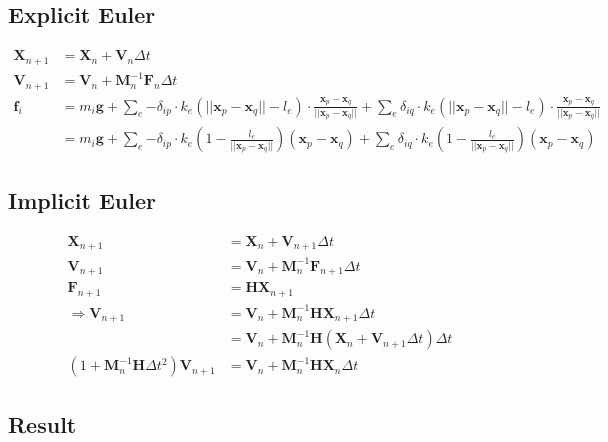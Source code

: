 \documentclass{article}
\begin{document}
\subsection*{Explicit Euler}
\begin{equation*}
  \begin{aligned}
    \bm{X}_{n+1} &= \bm{X}_n + \bm{V}_n\Delta t \\
    \bm{V}_{n+1} &= \bm{V}_n + \bm{M}_n^{-1}\bm{F}_n\Delta t \\
    \bm{f}_i &= m_i\bm{g} + \sum_e{-\delta_{ip}\cdot k_e(||\bm{x}_p-\bm{x}_q|| - l_e)\cdot \frac{\bm{x}_p-\bm{x}_q}{||\bm{x}_p-\bm{x}_q||}} + \sum_e{\delta_{iq}\cdot k_e(||\bm{x}_p-\bm{x}_q|| - l_e)\cdot \frac{\bm{x}_p-\bm{x}_q}{||\bm{x}_p-\bm{x}_q||}} \\
    &= m_i\bm{g} + \sum_e{-\delta_{ip}\cdot k_e(1 - \frac{l_e}{||\bm{x}_p-\bm{x}_q||})(\bm{x}_p-\bm{x}_q)} + \sum_e{\delta_{iq}\cdot k_e(1 - \frac{l_e}{||\bm{x}_p-\bm{x}_q||})(\bm{x}_p-\bm{x}_q)}
  \end{aligned}
\end{equation*}

\subsection*{Implicit Euler}
\begin{equation*}
  \begin{aligned}
    \bm{X}_{n+1} &= \bm{X}_n + \bm{V}_{n+1}\Delta t \\
    \bm{V}_{n+1} &= \bm{V}_n + \bm{M}_n^{-1}\bm{F}_{n+1}\Delta t \\
    \bm{F}_{n+1} &= \bm{H}\bm{X}_{n+1} \\
    \Rightarrow \bm{V}_{n+1} &= \bm{V}_{n} + \bm{M}_n^{-1}\bm{H}\bm{X}_{n+1}\Delta t \\
    &= \bm{V}_{n} + \bm{M}_{n}^{-1}\bm{H}(\bm{X}_n + \bm{V}_{n+1}\Delta t)\Delta t \\
    (1+\bm{M}_{n}^{-1}\bm{H}\Delta t^2)\bm{V}_{n+1} &= \bm{V}_{n} + \bm{M}_{n}^{-1}\bm{H}\bm{X}_n\Delta t
  \end{aligned}
\end{equation*}

\subsection*{Result}
\end{document}
